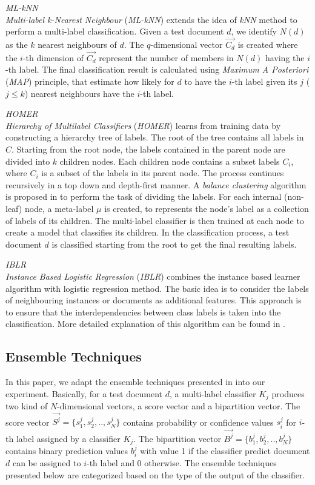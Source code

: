 \emph{ML-kNN}\\
\emph{Multi-label k-Nearest Neighbour} (\emph{ML-kNN}) extends the idea of \emph{kNN} method to perform a multi-label classification. Given a test document $d$, we identify $N(d)$ as the $k$ nearest neighbours of $d$. The $q$-dimensional vector $\vec{C_{d}}$ is created where the $i$-th dimension of $\vec{C_{d}}$ represent the number of members in $N(d)$ having the $i$-th label. The final classification result is calculated using \emph{Maximum A Posteriori} (\emph{MAP}) principle, that estimate how likely for $d$ to have the $i$-th label given its $j$ ($j\le k$) nearest neighbours have the $i$-th label.

\emph{HOMER}\\
\emph{Hierarchy of Multilabel Classifiers} (\emph{HOMER}) learns from training data by constructing a hierarchy tree of labels. The root of the tree contains all labels in $C$. Starting from the root node, the labels contained in the parent node are divided into $k$ children nodes. Each children node contains a subset labels $C_{i}$, where $C_{i}$ is a subset of the labels in its parent node. The process continues recursively in a top down and depth-first manner. A \emph{balance clustering} algorithm is proposed in \cite{HOMER} to perform the task of dividing the labels. For each internal (non-leaf) node, a meta-label $\mu$ is created, to represents the node's label as a collection of labels of its children. The multi-label classifier is then trained at each node to create a model that classifies its children. In the classification process, a test document $d$ is classified starting from the root to get the final resulting labels.

\emph{IBLR}\\
\emph{Instance Based Logistic Regression} (\emph{IBLR}) combines the instance based learner algorithm with logistic regression method. The basic idea is to consider the labels of neighbouring instances or documents as additional features. This approach is to ensure that the interdependencies between class labels is taken into the classification. More detailed explanation of this algorithm can be found in \cite{IBLR}.


\subsection{Ensemble Techniques}
In this paper, we adapt the ensemble techniques presented in \cite{sanden2011enhancing} into our experiment. Basically, for a test document $d$, a multi-label classifier $K_{j}$ produces two kind of $N$-dimensional vectors, a score vector and a bipartition vector. The score vector $\vec{S^{j}} = \{s^{j}_{1}, s^{j}_{2},..,s^{j}_{N}\}$ contains probability or confidence values $s^{j}_{i}$ for $i$-th label assigned by a classifier $K_{j}$. The bipartition vector $\vec{B^{j}} = \{b^{j}_{1}, b^{j}_{2},..,b^{j}_{N}\}$ contains binary prediction values $b^{j}_{i}$ with value 1 if the classifier predict document $d$ can be assigned to $i$-th label and 0 otherwise. The ensemble techniques presented below are categorized based on the type of the output of the classifier.

